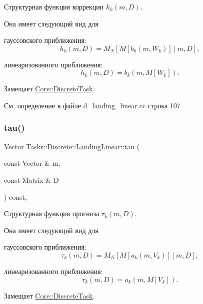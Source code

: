 Структурная функция коррекции $h_k(m, D)$. 

Она имеет следующий вид для


\begin{DoxyItemize}
\item гауссовского приближения\+: \[h_k(m, D) = M_N[M[b_k(m, W_k)] \ |\ m, D],\]
\item линеаризованного приближения\+: \[h_k(m, D) = b_k(m, M[W_k]).\] 
\end{DoxyItemize}

Замещает \hyperlink{class_core_1_1_discrete_task_a09eb964bfe445c1905758bfff4fc1537}{Core\+::\+Discrete\+Task}.



См. определение в файле d\+\_\+landing\+\_\+linear.\+cc строка 107

\hypertarget{class_tasks_1_1_discrete_1_1_landing_linear_a8f2022967fae3dde3e7d2df3f7fa98f8}{}\label{class_tasks_1_1_discrete_1_1_landing_linear_a8f2022967fae3dde3e7d2df3f7fa98f8} 
\subsubsection{\texorpdfstring{tau()}{tau()}}
{\footnotesize\ttfamily Vector Tasks\+::\+Discrete\+::\+Landing\+Linear\+::tau (\begin{DoxyParamCaption}\item[{const Vector \&}]{m,  }\item[{const Matrix \&}]{D }\end{DoxyParamCaption}) const\hspace{0.3cm}{\ttfamily [override]}, {\ttfamily [virtual]}}



Структурная функция прогноза $\tau_k(m, D)$. 

Она имеет следующий вид для


\begin{DoxyItemize}
\item гауссовского приближения\+: \[\tau_k(m, D) = M_N[M[a_k(m, V_k)] \ |\ m, D],\]
\item линеаризованного приближения\+: \[\tau_k(m, D) = a_k(m, M[V_k]).\] 
\end{DoxyItemize}

Замещает \hyperlink{class_core_1_1_discrete_task_aed780d7286bc88d0a2debb585601b3ca}{Core\+::\+Discrete\+Task}.



